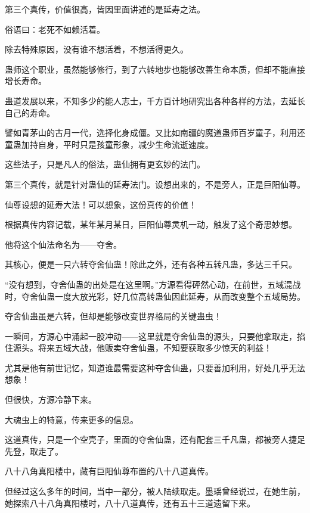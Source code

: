 
\begin{this_body}

第三个真传，价值很高，皆因里面讲述的是延寿之法。

俗语曰：老死不如赖活着。

除去特殊原因，没有谁不想活着，不想活得更久。

蛊师这个职业，虽然能够修行，到了六转地步也能够改善生命本质，但却不能直接增长寿命。

蛊道发展以来，不知多少的能人志士，千方百计地研究出各种各样的方法，去延长自己的寿命。

譬如青茅山的古月一代，选择化身成僵。又比如南疆的魔道蛊师百岁童子，利用还童蛊加持自身，平时只是孩童形象，减少生命流逝速度。

这些法子，只是凡人的俗法，蛊仙拥有更玄妙的法门。

第三个真传，就是针对蛊仙的延寿法门。设想出来的，不是旁人，正是巨阳仙尊。

仙尊设想的延寿大法！可以想象，这份真传的价值！

根据真传内容记载，某年某月某日，巨阳仙尊灵机一动，触发了这个奇思妙想。

他将这个仙法命名为——夺舍。

其核心，便是一只六转夺舍仙蛊！除此之外，还有各种五转凡蛊，多达三千只。

“没有想到，夺舍仙蛊的出处是在这里啊。”方源看得砰然心动，在前世，五域混战时，夺舍仙蛊一度大放光彩，好几位高转蛊仙因此延寿，从而改变整个五域局势。

夺舍仙蛊虽是六转，但却是能够改变世界格局的关键蛊虫！

一瞬间，方源心中涌起一股冲动——这里就是夺舍仙蛊的源头，只要他拿取走，掐住源头。将来五域大战，他贩卖夺舍仙蛊，不知要获取多少惊天的利益！

尤其是他有前世记忆，知道谁最需要这种夺舍仙蛊，只要善加利用，好处几乎无法想象！

但很快，方源冷静下来。

大魂虫上的特意，传来更多的信息。

这道真传，只是一个空壳子，里面的夺舍仙蛊，还有配套三千凡蛊，都被旁人捷足先登，取走了。

八十八角真阳楼中，藏有巨阳仙尊布置的八十八道真传。

但经过这么多年的时间，当中一部分，被人陆续取走。墨瑶曾经说过，在她生前，她探索八十八角真阳楼时，八十八道真传，还有五十三道遗留下来。


\end{this_body}
